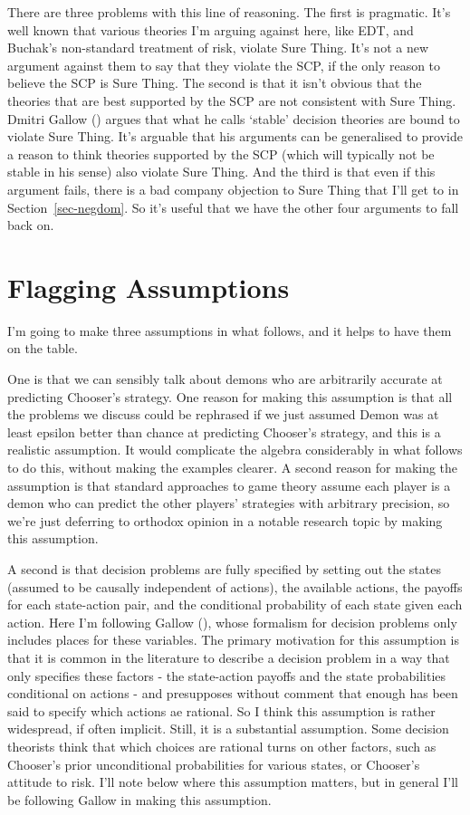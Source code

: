 \documentclass[
  11pt,
  letterpaper,
  DIV=11,
  numbers=noendperiod,
  twoside]{scrartcl}
\begin{document}
There are three problems with this line of reasoning. The first is
pragmatic. It's well known that various theories I'm arguing against
here, like EDT, and Buchak's non-standard treatment of risk, violate
Sure Thing. It's not a new argument against them to say that they
violate the SCP, if the only reason to believe the SCP is Sure Thing.
The second is that it isn't obvious that the theories that are best
supported by the SCP are not consistent with Sure Thing. Dmitri Gallow
() argues that what he calls `stable'
decision theories are bound to violate Sure Thing. It's arguable that
his arguments can be generalised to provide a reason to think theories
supported by the SCP (which will typically not be stable in his sense)
also violate Sure Thing. And the third is that even if this argument
fails, there is a bad company objection to Sure Thing that I'll get to
in Section~\ref{sec-negdom}. So it's useful that we have the other four
arguments to fall back on.

\section{Flagging Assumptions}\label{sec-flagging}

I'm going to make three assumptions in what follows, and it helps to
have them on the table.

One is that we can sensibly talk about demons who are arbitrarily
accurate at predicting Chooser's strategy. One reason for making this
assumption is that all the problems we discuss could be rephrased if we
just assumed Demon was at least epsilon better than chance at predicting
Chooser's strategy, and this is a realistic assumption. It would
complicate the algebra considerably in what follows to do this, without
making the examples clearer. A second reason for making the assumption
is that standard approaches to game theory assume each player is a demon
who can predict the other players' strategies with arbitrary precision,
so we're just deferring to orthodox opinion in a notable research topic
by making this assumption.

A second is that decision problems are fully specified by setting out
the states (assumed to be causally independent of actions), the
available actions, the payoffs for each state-action pair, and the
conditional probability of each state given each action. Here I'm
following Gallow (), whose formalism for
decision problems only includes places for these variables. The primary
motivation for this assumption is that it is common in the literature to
describe a decision problem in a way that only specifies these factors -
the state-action payoffs and the state probabilities conditional on
actions - and presupposes without comment that enough has been said to
specify which actions ae rational. So I think this assumption is rather
widespread, if often implicit. Still, it is a substantial assumption.
Some decision theorists think that which choices are rational turns on
other factors, such as Chooser's prior unconditional probabilities for
various states, or Chooser's attitude to risk. I'll note below where
this assumption matters, but in general I'll be following Gallow in
making this assumption.
\end{document}
